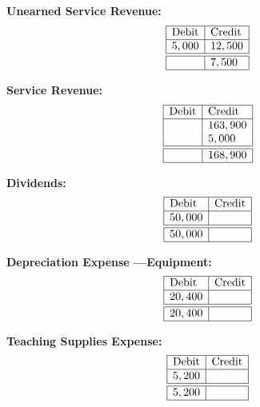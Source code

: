 \documentclass[12pt,a4paper]{book}
\begin{document}
\begin{multicols}{3}
\vspace{0.5cm}

\textbf{Unearned Service Revenue:}
\[
\begin{array}{|l|l|}
\hline
\text{Debit} & \text{Credit} \\
\hline
5,000 & 12,500 \\
\hline \hline
 & 7,500 \\
\hline
\end{array}
\]

\vspace{0.5cm}

\textbf{Service Revenue:}
\[
\begin{array}{|l|l|}
\hline
\text{Debit} & \text{Credit} \\
\hline
 & 163,900 \\
 & 5,000 \\
\hline \hline 
 & 168,900 \\
\hline
\end{array}
\]

\vspace{0.5cm}

\textbf{Dividends:}
\[
\begin{array}{|l|l|}
\hline
\text{Debit} & \text{Credit} \\
\hline
50,000 & \\
\hline \hline 
50,000 & \\
\hline
\end{array}
\]

\vspace{0.5cm}

\textbf{Depreciation Expense —Equipment:}
\[
\begin{array}{|l|l|}
\hline
\text{Debit} & \text{Credit} \\
\hline
20,400 & \\
\hline \hline 
20,400 & \\
\hline
\end{array}
\]

\vspace{0.5cm}

\textbf{Teaching Supplies Expense:}
\[
\begin{array}{|l|l|}
\hline
\text{Debit} & \text{Credit} \\
\hline
5,200 & \\
\hline \hline 
5,200 & \\
\hline
\end{array}
\]

\vspace{0.5cm}


\end{multicols}
\end{document}

